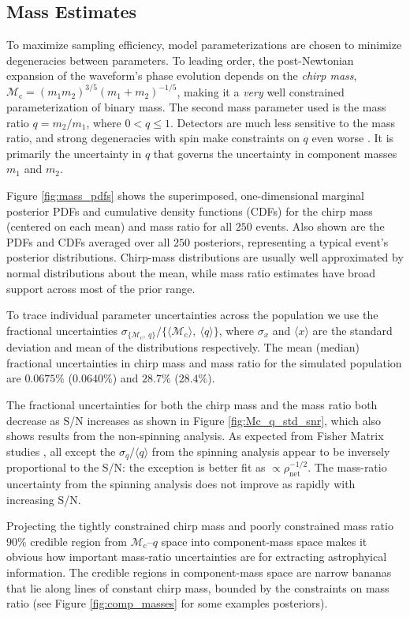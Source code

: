 \subsection{Mass Estimates}\label{sec:mass}
To maximize sampling efficiency, model parameterizations are chosen to minimize degeneracies between parameters.  To leading order, the post-Newtonian expansion of the waveform's phase evolution depends on the \emph{chirp mass}, $\mathcal{M}_\mathrm{c} = (m_1 m_2)^{3/5} (m_1 + m_2)^{-1/5}$, making it a \emph{very} well constrained parameterization of binary mass.  The second mass parameter used is the mass ratio $q = m_2/m_1$, where $0 < q \leq 1$.  Detectors are much less sensitive to the mass ratio, and strong degeneracies with spin make constraints on $q$ even worse \citep{Cutler_1994}.  It is primarily the uncertainty in $q$ that governs the uncertainty in component masses $m_1$ and $m_2$.

Figure \ref{fig:mass_pdfs} shows the superimposed, one-dimensional marginal posterior PDFs and cumulative density functions (CDFs) for the chirp mass (centered on each mean) and mass ratio for all $250$ events.  Also shown are the PDFs and CDFs averaged over all $250$ posteriors, representing a typical event's posterior distributions.  Chirp-mass distributions are usually well approximated by normal distributions about the mean, while mass ratio estimates have broad support across most of the prior range.

To trace individual parameter uncertainties across the population we use the fractional uncertainties $\sigma_{\{\mathcal{M}_\mathrm{c},~q\}}/\{\langle\mathcal{M}_\mathrm{c}\rangle,~\langle q\rangle\}$, where $\sigma_x$ and $\langle x\rangle$ are the standard deviation and mean of the distributions respectively. The mean (median) fractional uncertainties in chirp mass and mass ratio for the simulated population are $0.0675\%$ ($0.0640\%$) and $28.7\%$ ($28.4\%$).

The fractional uncertainties for both the chirp mass and the mass ratio both decrease as S/N increases as shown in Figure \ref{fig:Mc_q_std_snr}, which also shows results from the non-spinning analysis. As expected from Fisher Matrix studies \citep[e.g.,]{FinnChernoff}, all except the $\sigma_q/\langle q\rangle$ from the spinning analysis appear to be inversely proportional to the S/N: the exception is better fit as $\propto \rho_\mathrm{net}^{-1/2}$. The mass-ratio uncertainty from the spinning analysis does not improve as rapidly with increasing S/N.
  
Projecting the tightly constrained chirp mass and poorly constrained mass ratio $90\%$ credible region from $\mathcal{M}_\mathrm{c}$--$q$ space into component-mass space makes it obvious how important mass-ratio uncertainties are for extracting astrophyical information.  The credible regions in component-mass space are narrow bananas that lie along lines of constant chirp mass, bounded by the constraints on mass ratio (see Figure \ref{fig:comp_masses} for some examples posteriors).
  
  
  